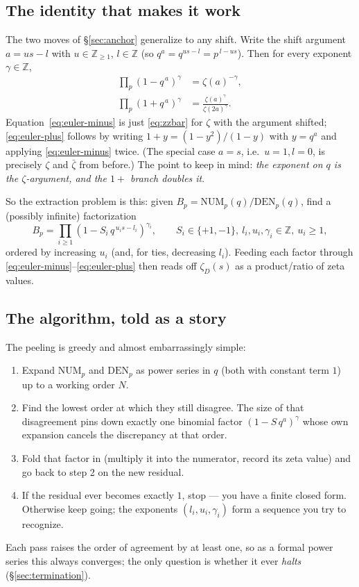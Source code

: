 \documentclass[11pt]{article}
\newcommand{\zD}{\zeta_D}
\newcommand{\zbar}{\bar\zeta}
\begin{document}
\subsection{The identity that makes it work}

The two moves of \S\ref{sec:anchor} generalize to any shift. Write the shift
argument $a=us-l$ with $u\in\mathbb{Z}_{\ge1}$, $l\in\mathbb{Z}$ (so
$q^{a}=q^{us-l}=p^{\,l-us}$). Then for every exponent $\gamma\in\mathbb{Z}$,
\begin{align}
\prod_p (1 - q^{\,a})^{\gamma} &= \zeta(a)^{-\gamma}, \label{eq:euler-minus}\\
\prod_p (1 + q^{\,a})^{\gamma} &= \frac{\zeta(a)^{\gamma}}{\zeta(2a)^{\gamma}}. \label{eq:euler-plus}
\end{align}
Equation~\eqref{eq:euler-minus} is just \eqref{eq:zzbar} for $\zeta$ with the
argument shifted; \eqref{eq:euler-plus} follows by writing $1+y=(1-y^2)/(1-y)$ with
$y=q^{a}$ and applying \eqref{eq:euler-minus} twice. (The special case $a=s$, i.e.\
$u=1,l=0$, is precisely $\zeta$ and $\zbar$ from before.) The point to keep in mind:
\emph{the exponent on $q$ is the $\zeta$-argument, and the $1+$ branch doubles it}.

So the extraction problem is this: given $B_p=\mathrm{NUM}_p(q)/\mathrm{DEN}_p(q)$,
find a (possibly infinite) factorization
\begin{equation}
\label{eq:master-factorization}
B_p = \prod_{i\ge1} (1 - S_i\, q^{\,u_i s - l_i})^{\gamma_i}, \qquad
S_i\in\{+1,-1\},\ l_i,u_i,\gamma_i\in\mathbb{Z},\ u_i\ge1,
\end{equation}
ordered by increasing $u_i$ (and, for ties, decreasing $l_i$). Feeding each factor
through \eqref{eq:euler-minus}--\eqref{eq:euler-plus} then reads off $\zD(s)$ as a
product/ratio of zeta values.

\subsection{The algorithm, told as a story}
\label{sec:algo}

The peeling is greedy and almost embarrassingly simple:
\begin{enumerate}
\item Expand $\mathrm{NUM}_p$ and $\mathrm{DEN}_p$ as power series in $q$ (both with
constant term $1$) up to a working order $N$.
\item Find the lowest order at which they still disagree. The size of that
disagreement pins down exactly one binomial factor $(1-S\,q^{a})^{\gamma}$ whose own
expansion cancels the discrepancy at that order.
\item Fold that factor in (multiply it into the numerator, record its zeta value)
and go back to step 2 on the new residual.
\item If the residual ever becomes exactly $1$, stop --- you have a finite closed
form. Otherwise keep going; the exponents $(l_i,u_i,\gamma_i)$ form a sequence you
try to recognize.
\end{enumerate}
Each pass raises the order of agreement by at least one, so as a formal power series
this always converges; the only question is whether it ever \emph{halts}
(\S\ref{sec:termination}).
\end{document}
